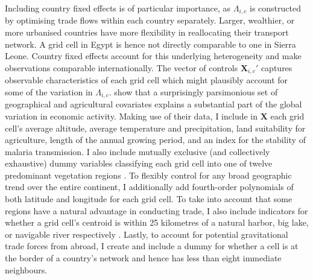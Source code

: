 \documentclass[11pt, oneside]{article}   	%
\begin{document}
Including country fixed effects is of particular importance, as $\Lambda_{i,c}$ is constructed by optimising trade flows within each country separately. Larger, wealthier, or more urbanised countries have more flexibility in reallocating their transport network. A grid cell in Egypt is hence not directly comparable to one in Sierra Leone.  Country fixed effects account for this underlying heterogeneity and make observations comparable internationally. The vector of controls $\textbf{X}_{i,c}'$ captures observable characteristics of each grid cell which might plausibly account for some of the variation in $\Lambda_{i,c}$. \cite{henderson_global_2018} show that a surprisingly parsimonious set of geographical and agricultural covariates explains a substantial part of the global variation in economic activity. Making use of their data, I include in $\textbf{X}$ each grid cell's average altitude, average temperature and precipitation, land suitability for agriculture, length of the annual growing period, and an index for the stability of malaria transmission. I also include mutually exclusive (and collectively exhaustive) dummy variables classifying each grid cell into one of twelve predominant vegetation regions \citep[or \emph{Biomes}, see][]{henderson_global_2018}. To flexibly control for any broad geographic trend over the entire continent, I additionally add fourth-order polynomials of both latitude and longitude for each grid cell. To take into account that some regions have a natural advantage in conducting trade, I also include indicators for whether a grid cell's centroid is within 25 kilometres of a natural harbor, big lake, or navigable river respectively \citep[again using data from][]{henderson_global_2018}. Lastly, to account for potential gravitational trade forces from abroad, I create and include a dummy for whether a cell is at the border of a country's network and hence has less than eight immediate neighbours.
\end{document}
